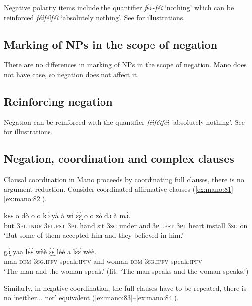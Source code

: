 \documentclass[output=paper,colorlinks,citecolor=brown]{langscibook}
\begin{document}
Negative polarity items include the quantifier \textit{fɛ́ì{\textasciitilde}féì} ‘nothing’ which can be reinforced \textit{féìféìféì} ‘absolutely nothing’. See  for illustrations.

\subsection{Marking of NPs in the scope of negation}\label{sec:mano:4.3}

There are no differences in marking of NPs in the scope of negation. Mano does not have case, so negation does not affect it.

\subsection{Reinforcing negation}\label{sec:mano:4.4}

Negation can be reinforced with the quantifier \textit{féìféìféì} ‘absolutely nothing’. See  for illustrations.

\subsection{Negation, coordination and complex clauses}\label{sec:mano:4.5}

Clausal coordination in Mano proceeds by coordinating full clauses, there is no argument reduction. Consider coordinated affirmative clauses (\ref{ex:mano:81}--\ref{ex:mano:82}).

\ea\label{ex:mano:81}
    \gll kɛ̄ɛ̄ ō dò ō ō kɔ̀ yà à wì ɛ̰́ɛ̰́ ō ō zò dɔ̄ à mɔ̀. \\
         but \textsc{3pl} \textsc{indf} \textsc{3pl.pst} \textsc{3pl} hand sit \textsc{3sg} under and \textsc{3pl.pst} \textsc{3pl} heart install \textsc{3sg} on\\
    \glt ‘But some of them accepted him and they believed in him.’
\z

\ea\label{ex:mano:82}
    \gll gɔ̰́ yāā lɛ́ɛ̀ wèè ɛ̰́ɛ̰́ léé ā lɛ́ɛ̀ wèè. \\
         man \textsc{dem} \textsc{3sg.ipfv} speak\textsc{:ipfv} and woman \textsc{dem} \textsc{3sg.ipfv} speak:\textsc{ipfv}\\
    \glt ‘The man and the woman speak.’ (lit. ‘The man speaks and the woman speaks.’)
\z

Similarly, in negative coordination, the full clauses have to be repeated, there is no ‘neither... nor’ equivalent (\ref{ex:mano:83}--\ref{ex:mano:84}). 
\end{document}
